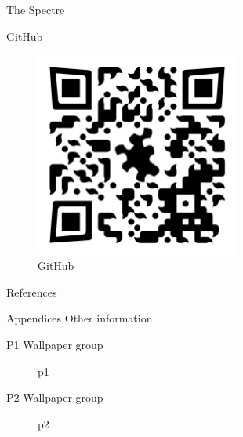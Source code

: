 \documentclass{beamer}
\theoremstyle{definition}
\begin{document}
\begin{frame}{The Spectre}
    
\end{frame}

\begin{frame}{GitHub}
    \begin{figure}
        \centering
        \includegraphics[width=0.6\textwidth]{images/qr-codes/tilling-presentation-github.png}
        \caption{GitHub}
        \label{fig:github-qrcode}
    \end{figure}
\end{frame}

\begin{frame}{References}
    
\end{frame}



\begin{frame}{Appendices}
    Other information
\end{frame}

\begin{frame}{P1 Wallpaper group}
    \begin{figure}
        \centering
        
        \caption{p1}
        \label{fig:p1}
    \end{figure}
\end{frame}

\begin{frame}{P2 Wallpaper group}
    \begin{figure}
        \centering
        
        \caption{p2}
        \label{fig:p2}
    \end{figure}
\end{frame}
\end{document}

